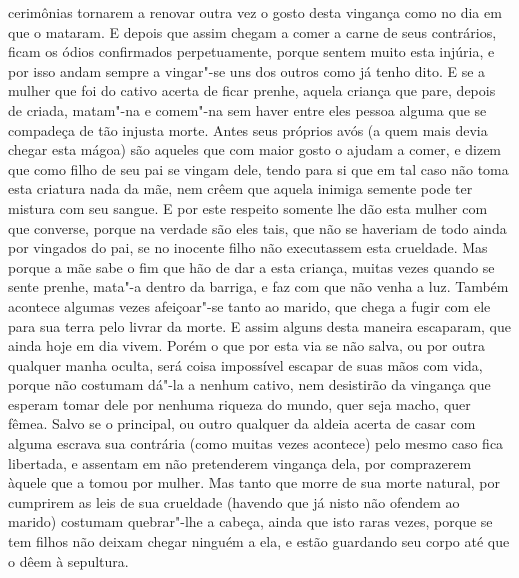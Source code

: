 cerimônias tornarem a renovar outra vez o gosto desta vingança como no
dia em que o mataram. E depois que assim chegam a comer a carne de seus
contrários, ficam os ódios confirmados perpetuamente, porque sentem
muito esta injúria, e por isso andam sempre a vingar"-se uns dos outros
como já tenho dito. E se a mulher que foi do cativo acerta de ficar
prenhe, aquela criança que pare, depois de criada, matam"-na e comem"-na		%
sem haver entre eles pessoa alguma que se compadeça de tão injusta
morte. Antes seus próprios avós (a quem mais devia chegar esta mágoa)
são aqueles que com maior gosto o ajudam a comer, e dizem que como
filho de seu pai se vingam dele, tendo para si que em tal caso não toma			%
esta criatura nada da mãe, nem crêem que aquela inimiga semente pode ter
mistura com seu sangue. E por este respeito somente lhe dão esta
mulher com que converse, porque na verdade são eles tais, que não se
haveriam de todo ainda por vingados do pai, se no inocente filho não			%
executassem esta crueldade. Mas porque a mãe sabe o fim que hão de dar
a esta criança, muitas vezes quando se sente prenhe, mata"-a dentro da
barriga, e faz com que não venha a luz. Também acontece algumas vezes
afeiçoar"-se tanto ao marido, que chega a fugir com ele para sua terra
pelo livrar da morte. E assim alguns  desta maneira
escaparam, que ainda hoje em dia vivem. Porém o que por esta via se não
salva, ou por outra qualquer manha oculta, será coisa impossível
escapar de suas mãos com vida, porque não costumam dá"-la a nenhum
cativo, nem desistirão da vingança que esperam tomar dele por nenhuma
riqueza do mundo, quer seja macho, quer fêmea. Salvo se o principal, ou
outro qualquer da aldeia acerta de casar com alguma escrava sua contrária
(como muitas vezes acontece) pelo mesmo caso fica libertada, e assentam
em não pretenderem vingança dela, por comprazerem àquele que a tomou
por mulher. Mas tanto que morre de sua morte natural, por cumprirem as
leis de sua crueldade (havendo que já nisto não ofendem ao marido)
costumam quebrar"-lhe a cabeça, ainda que isto raras vezes, porque se
tem filhos não deixam chegar ninguém a ela, e estão guardando seu corpo
até que o dêem à sepultura.

